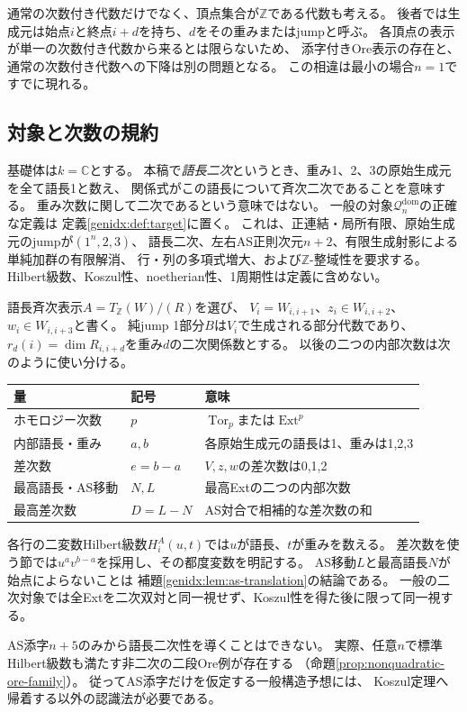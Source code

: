 \documentclass[11pt,a4paper]{ltjsarticle}
\theoremstyle{definition}
\begin{document}
通常の次数付き代数だけでなく、頂点集合が$\mathbb Z$である代数も考える。
後者では生成元は始点$i$と終点$i+d$を持ち、$d$をその重みまたはjumpと呼ぶ。
各頂点の表示が単一の次数付き代数から来るとは限らないため、
添字付きOre表示の存在と、通常の次数付き代数への下降は別の問題となる。
この相違は最小の場合$n=1$ですでに現れる。

\subsection{対象と次数の規約}
基礎体は$k=\mathbb C$とする。
本稿で\emph{語長二次}というとき、重み1、2、3の原始生成元を全て語長1と数え、
関係式がこの語長について斉次二次であることを意味する。
重み次数に関して二次であるという意味ではない。
一般の対象$\mathcal Q_n^{\mathrm{dom}}$の正確な定義は
定義\ref{genidx:def:target}に置く。
これは、正連結・局所有限、原始生成元のjumpが$(1^n,2,3)$、
語長二次、左右AS正則次元$n+2$、有限生成射影による単純加群の有限解消、
行・列の多項式増大、および$\mathbb Z$-整域性を要求する。
Hilbert級数、Koszul性、noetherian性、1周期性は定義に含めない。

語長斉次表示$A=T_{\mathbb Z}(W)/(R)$を選び、
$V_i=W_{i,i+1}$、$z_i\in W_{i,i+2}$、$w_i\in W_{i,i+3}$と書く。
純jump 1部分$B$は$V_i$で生成される部分代数であり、
$r_d(i)=\dim R_{i,i+d}$を重み$d$の二次関係数とする。
以後の二つの内部次数は次のように使い分ける。
\begin{center}
\begin{tabular}{lll}
\toprule
量 & 記号 & 意味\\
\midrule
ホモロジー次数 & $p$ & $\operatorname{Tor}_p$または$\operatorname{Ext}^p$\\
内部語長・重み & $a,b$ & 各原始生成元の語長は1、重みは1,2,3\\
差次数 & $e=b-a$ & $V,z,w$の差次数は0,1,2\\
最高語長・AS移動 & $N,L$ & 最高Extの二つの内部次数\\
最高差次数 & $D=L-N$ & AS対合で相補的な差次数の和\\
\bottomrule
\end{tabular}
\end{center}
各行の二変数Hilbert級数$H_i^A(u,t)$では$u$が語長、$t$が重みを数える。
差次数を使う節では$u^av^{b-a}$を採用し、その都度変数を明記する。
AS移動$L$と最高語長$N$が始点によらないことは
補題\ref{genidx:lem:as-translation}の結論である。
一般の二次対象では全Extを二次双対と同一視せず、Koszul性を得た後に限って同一視する。

AS添字$n+5$のみから語長二次性を導くことはできない。
実際、任意$n$で標準Hilbert級数も満たす非二次の二段Ore例が存在する
（命題\ref{prop:nonquadratic-ore-family}）。
従ってAS添字だけを仮定する一般構造予想には、
Koszul定理へ帰着する以外の認識法が必要である。
\end{document}
